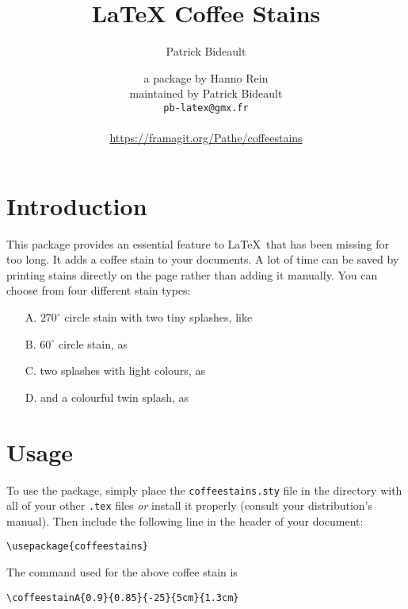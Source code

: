 \documentclass[a4paper, 11pt, BCOR = 0 pt, oneside, english]{scrartcl}
\author{Patrick Bideault}
\begin{document}
\title{LaTeX Coffee Stains}
\author{a package by Hanno Rein\\
  maintained by Patrick Bideault\\
  \texttt{pb-latex@gmx.fr}\\
  ~\\
  \url{https://framagit.org/Pathe/coffeestains}}
\renewcommand{\today}{version \gitRel{} -- \DTMtoday{}}
\maketitle

\label{stainA}
\section{Introduction}
This package provides an essential feature to \LaTeX~that has been missing for
too long. It adds a coffee stain to your documents. A lot of time can be saved
by printing stains directly on the page rather than adding it manually. You can
choose from four different stain types:
\begin{itemize}
\item[A.] $270^\circ$ circle stain with two tiny splashes, like 
  \item[B.] $60^\circ$ circle stain, as 
  \item[C.] two splashes with light colours, as 
  \item[D.] and a colourful twin splash, as 
\end{itemize}

\section{Usage}
To use the package, simply place the \texttt{coffeestains.sty} file in the directory with all of your 
other \texttt{.tex} files \textit{or} install it properly (consult your distribution's manual). 
Then include the following line in the header of your document:
\begin{verbatim}
\usepackage{coffeestains}
\end{verbatim}

\vfill{}

\begin{tcolorbox}
  The command used for the above coffee stain is

  \verb|\coffeestainA{0.9}{0.85}{-25}{5cm}{1.3cm}|
\end{tcolorbox}
\newpage{}
\label{stainC}
\end{document}
